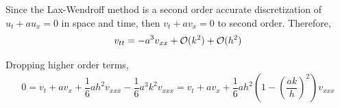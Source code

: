 \documentclass[10pt]{article}
\begin{document}
\begin{solution}[Solution]
Since the Lax-Wendroff method is a second order accurate discretization of \( u_t + au_x = 0 \) in space and time, then \( v_t + av_x = 0 \) to second order. Therefore,
\begin{align*}
    v_{tt} = -a^3 v_{xx} + \mathcal{O}(k^2) + \mathcal{O}(h^2)
\end{align*}

Dropping higher order terms,
\begin{align*}
    0 = v_t + av_x + \dfrac{1}{6} ah^2 v_{xxx} - \dfrac{1}{6}a^3k^2 v_{xxx}
    = v_t + a v_x + \dfrac{1}{6}ah^2 \left( 1 - \left( \dfrac{ak}{h}  \right)^2 \right) v_{xxx}
\end{align*}

\end{solution}
\end{document}
